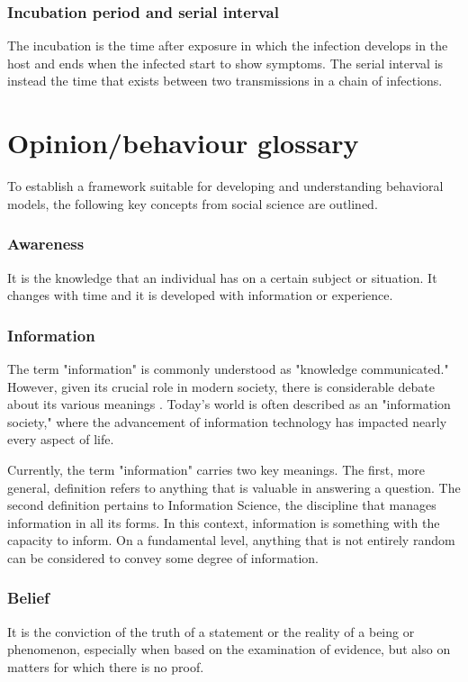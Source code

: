 \subsubsection{Incubation period and serial interval} The incubation is the time after exposure in which the infection develops in the host and ends when the infected start to show symptoms. The serial interval is instead the time that exists between two transmissions in a chain of infections. 

\section{Opinion/behaviour glossary}
To establish a framework suitable for developing and understanding behavioral models, the following key concepts from social science are outlined.
\subsubsection{Awareness} It is the knowledge that an individual has on a certain subject or situation. It changes with time and it is developed with information or experience.  
\subsubsection{Information} The term "information" is commonly understood as "knowledge communicated." However, given its crucial role in modern society, there is considerable debate about its various meanings \cite{Capurro_2003}. Today’s world is often described as an "information society," where the advancement of information technology has impacted nearly every aspect of life.

Currently, the term "information" carries two key meanings. The first, more general, definition refers to anything that is valuable in answering a question. The second definition pertains to Information Science, the discipline that manages information in all its forms. In this context, information is something with the capacity to inform. On a fundamental level, anything that is not entirely random can be considered to convey some degree of information. 

\subsubsection{Belief} It is the conviction of the truth of a statement or the reality of a being or phenomenon, especially when based on the examination of evidence, but also on matters for which there is no proof.

